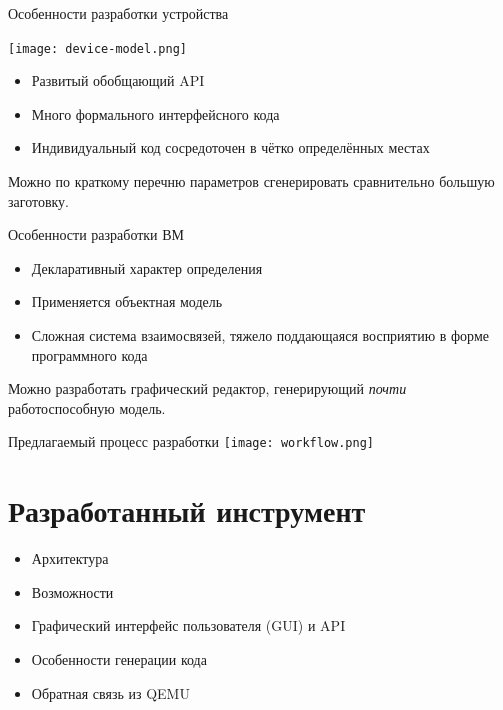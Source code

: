 \documentclass[unicode,hyperref={unicode=true}]{beamer}
\newcommand*{\sectionpagekb}{\usebeamertemplate*{section page kb}}
\theoremstyle{definition}
\theoremstyle{plain}
\begin{document}
\begin{frame}{Особенности разработки устройства}

\begin{minipage}{0.6\textwidth}
\texttt{[image: device-model.png]}
\end{minipage}
\begin{minipage}{0.38\textwidth}
\begin{itemize}
\item Развитый обобщающий API
\item Много формального интерфейсного кода
\item Индивидуальный код сосредоточен в чётко определённых местах
\end{itemize}
\end{minipage}

\begin{center}
Можно по краткому перечню параметров сгенерировать сравнительно большую
заготовку.
\end{center}

\end{frame}



\begin{frame}{Особенности разработки ВМ}

\begin{itemize}
\item Декларативный характер определения
\item Применяется объектная модель
\item Сложная система взаимосвязей, тяжело поддающаяся восприятию в форме
программного кода
\end{itemize}

\begin{center}
Можно разработать графический редактор, генерирующий {\it{}почти}
работоспособную модель.
\end{center}

\end{frame}



\begin{frame}{Предлагаемый процесс разработки}
\texttt{[image: workflow.png]}
\end{frame}



\section{Разработанный инструмент}
\begin{frame}{}
\sectionpagekb
\begin{itemize}
\item Архитектура
\item Возможности
\item Графический интерфейс пользователя (GUI) и API
\item Особенности генерации кода
\item Обратная связь из QEMU
\end{itemize}
\end{frame}{}
\end{document}
